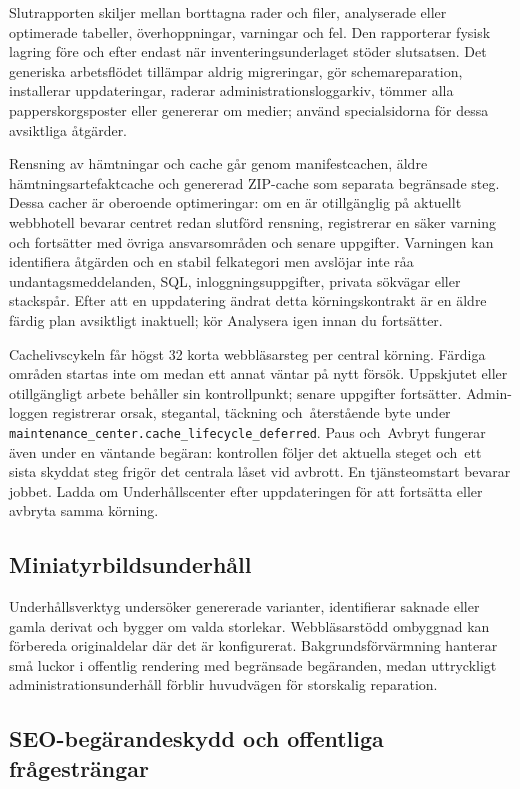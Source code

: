 \documentclass[11pt,a4paper]{article}
\newcommand{\codeword}[1]{\nolinkurl{#1}}
\begin{document}
Slutrapporten skiljer mellan borttagna rader och filer, analyserade eller
optimerade tabeller, överhoppningar, varningar och fel. Den rapporterar fysisk
lagring före och efter endast när inventeringsunderlaget stöder slutsatsen. Det
generiska arbetsflödet tillämpar aldrig migreringar, gör schemareparation,
installerar uppdateringar, raderar administrationsloggarkiv, tömmer alla
papperskorgsposter eller genererar om medier; använd specialsidorna för dessa
avsiktliga åtgärder.

Rensning av hämtningar och cache går genom manifestcachen, äldre
hämtningsartefaktcache och genererad ZIP-cache som separata begränsade steg.
Dessa cacher är oberoende optimeringar: om en är otillgänglig på aktuellt
webbhotell bevarar centret redan slutförd rensning, registrerar en säker varning
och fortsätter med övriga ansvarsområden och senare uppgifter. Varningen kan
identifiera åtgärden och en stabil felkategori men avslöjar inte råa
undantagsmeddelanden, SQL, inloggningsuppgifter, privata sökvägar eller
stackspår. Efter att en uppdatering ändrat detta körningskontrakt är en äldre
färdig plan avsiktligt inaktuell; kör Analysera igen innan du fortsätter.

Cachelivscykeln får högst 32 korta webbläsarsteg per central körning.
Färdiga områden startas inte om medan ett annat väntar på nytt försök.
Uppskjutet eller otillgängligt arbete behåller sin kontrollpunkt; senare
uppgifter fortsätter. Admin-loggen registrerar orsak, stegantal, täckning
och~återstående byte under
\codeword{maintenance\_center.cache\_lifecycle\_deferred}.
Paus och~Avbryt fungerar även under en väntande begäran: kontrollen följer
det aktuella steget och~ett sista skyddat steg frigör det centrala låset vid
avbrott. En tjänsteomstart bevarar jobbet. Ladda om Underhållscenter efter
uppdateringen för att fortsätta eller avbryta samma körning.

\subsection{Miniatyrbildsunderhåll}

Underhållsverktyg undersöker genererade varianter, identifierar saknade eller
gamla derivat och bygger om valda storlekar. Webbläsarstödd ombyggnad kan
förbereda originaldelar där det är konfigurerat. Bakgrundsförvärmning hanterar
små luckor i offentlig rendering med begränsade begäranden, medan uttryckligt
administrationsunderhåll förblir huvudvägen för storskalig reparation.

\subsection{SEO-begärandeskydd och offentliga frågesträngar}
\end{document}
